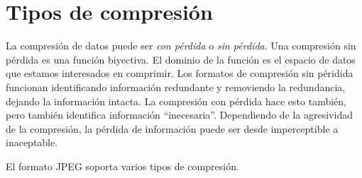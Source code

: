\section{Tipos de compresión}

La compresión de datos puede ser \emph{con pérdida} o \emph{sin pérdida}. Una compresión sin pérdida es una función biyectiva. El dominio de la función es el espacio de datos que estamos interesados en comprimir. Los formatos de compresión sin péridida funcionan identificando información redundante y removiendo la redundancia, dejando la información intacta. La compresión con pérdida hace esto también, pero también identifica información ``inecesaria''. Dependiendo de la agresividad de la compresión, la pérdida de información puede ser desde imperceptible a inaceptable.

El formato JPEG soporta varios tipos de compresión.

